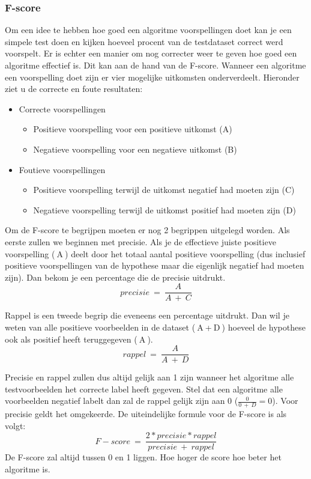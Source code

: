 \subsubsection{F-score}
Om een idee te hebben hoe goed een algoritme voorspellingen doet kan je een simpele test doen en kijken hoeveel procent van de testdataset correct werd voorspelt. Er is echter een manier om nog correcter weer te geven hoe goed een algoritme effectief is. Dit kan aan de hand van de F-score. \newline
Wanneer een algoritme een voorspelling doet zijn er vier mogelijke uitkomsten onderverdeelt. Hieronder ziet u de correcte en foute resultaten:
\begin{itemize}
	\item Correcte voorspellingen
	\begin{itemize}
		\item Positieve voorspelling voor een positieve uitkomst  (A)
		\item Negatieve voorspelling voor een negatieve uitkomst (B)
	\end{itemize}
	\item Foutieve voorspellingen
	\begin{itemize}
		\item Positieve voorspelling terwijl de uitkomst negatief had moeten zijn (C)
		\item Negatieve voorspelling terwijl de uitkomst positief had moeten zijn (D)
	\end{itemize}
\end{itemize}

Om de F-score te begrijpen moeten er nog 2 begrippen uitgelegd worden. Als eerste zullen we beginnen met precisie. \newline 
Als je de effectieve juiste positieve voorspelling ($\:$A$\:$) deelt door het totaal aantal positieve voorspelling (dus inclusief positieve voorspellingen van de hypothese maar die eigenlijk negatief had moeten zijn). Dan bekom je een percentage die de precisie uitdrukt. $$precisie\:=\:\frac{A}{A\:+\:C}$$

Rappel is een tweede begrip die eveneens een percentage uitdrukt. Dan wil je weten van alle positieve voorbeelden in de dataset ($\:$A$\:$+$\:$D$\:$) hoeveel de hypothese ook als positief heeft teruggegeven ($\:$A$\:$). $$rappel\:=\: \frac{A}{A\:+\:D}$$

Precisie en rappel zullen dus altijd gelijk aan 1 zijn wanneer het algoritme alle testvoorbeelden het correcte label heeft gegeven. Stel dat een algoritme alle voorbeelden negatief labelt dan zal de rappel gelijk zijn aan 0 ($\frac{0}{0\:+\:D}=0$). Voor precisie geldt het omgekeerde.
De uiteindelijke formule voor de F-score is als volgt: 
$$F-score\:=\: \frac{2* precisie * rappel}{precisie\:+\:rappel}$$
De F-score zal altijd tussen 0 en 1 liggen. Hoe hoger de score hoe beter het algoritme is. 

